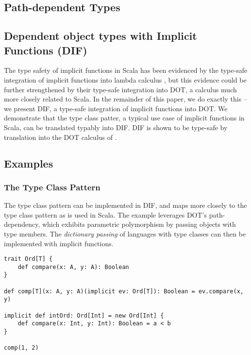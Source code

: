 \subsection{Path-dependent Types}
\TODOTHIS

\subsection{Dependent object types with Implicit Functions (DIF)}

The type safety of implicit functions in Scala has been evidenced by the
type-safe integration of implicit functions into lambda calculus \cite{OBLB18},
but this evidence could be further strengthened by their type-safe integration
into DOT, a calculus much more closely related to Scala. In the remainder of
this paper, we do exactly this -- we present DIF, a type-safe integration of
implicit functions into DOT. We demonstrate that the type class patter, a
typical use case of implicit functions in Scala, can be translated typably into
DIF. DIF is shown to be type-safe by translation into the DOT calculus of
\cite{AGORS16}.

\subsection{Examples}

\subsubsection{The Type Class Pattern}

The type class pattern \cite{OBLB18} can be implemented in DIF, and maps more
closely to the type class pattern as is used in Scala. The example leverages
DOT's path-dependency, which exhibits parametric polymorphism by passing
objects with type members. The \emph{dictionary passing} \cite{K88, WB89} of
languages with type classes can then be implemented with implicit functions.

\begin{minipage}{\textwidth}
\begin{lstlisting}[mathescape]
trait Ord[T] {
    def compare(x: A, y: A): Boolean
}

def comp[T](x: A, y: A)(implicit ev: Ord[T]): Boolean = ev.compare(x, y)

implicit def intOrd: Ord[Int] = new Ord[Int] {
    def compare(x: Int, y: Int): Boolean = a < b
}

comp(1, 2)
\end{lstlisting}
\end{minipage}

